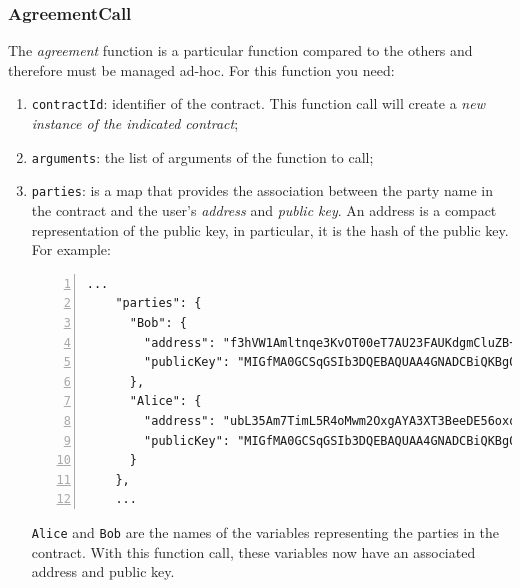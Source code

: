 \subsubsection{AgreementCall}
\label{agreement-call-message}

The \textit{agreement} function is a particular function compared to the others and therefore must be 
managed ad-hoc. For this function you need:
\begin{enumerate}
  \item \verb|contractId|: identifier of the contract. This function call will create a 
  \textit{new instance of the indicated contract};
  \item \verb|arguments|: the list of arguments of the function to call;
  \item \verb|parties|: is a map that provides the association between the party name in the contract 
  and the user's \textit{address} and \textit{public key}. An address is a compact representation of the 
  public key, in particular, it is the hash of the public key. For example:
  \begin{Verbatim}[numbers=left,xleftmargin=1cm,firstnumber=1,breaklines=true,breakanywhere=true,tabsize=2]
    ...
    "parties": {
      "Bob": {
        "address": "f3hVW1Amltnqe3KvOT00eT7AU23FAUKdgmCluZB+nss=",
        "publicKey": "MIGfMA0GCSqGSIb3DQEBAQUAA4GNADCBiQKBgQDErzzgD2ZslZxciFAiX3/ot7lrkZDw4148jFZrsDZPE6CVs9xXFSHGgy/mFvIFLXhnChO6Nyd2be3lbgeavLMCMVUiTStXr117Km17keWpb3sItkKKsLFBOcIIU8XXowI/OhzQN2XPZYESHgjdQ5vwEj2YyueiS7WKP94YWz/pswIDAQAB"
      },
      "Alice": {
        "address": "ubL35Am7TimL5R4oMwm2OxgAYA3XT3BeeDE56oxqdLc=",
        "publicKey": "MIGfMA0GCSqGSIb3DQEBAQUAA4GNADCBiQKBgQCo/GjVKS+3gAA55+kko41yINdOcCLQMSBQyuTTkKHE1mhu/TgOpivM0wLPsSga8hQMr3+v3aR0IF/vfCRf6SdiXmWx/jflmEXtnT6fkGcnV6dGNUpHWXSpwUIDt0N88jfnEqekx4S+KDCKg99sGEeHeT65fKS8lB0gjHMt9AOriwIDAQAB"
      }
    },
    ...
  \end{Verbatim}
  
  \verb|Alice| and \verb|Bob| are the names of the variables representing the parties in the contract. 
  With this function call, these variables now have an associated address and public key.


\end{enumerate}
